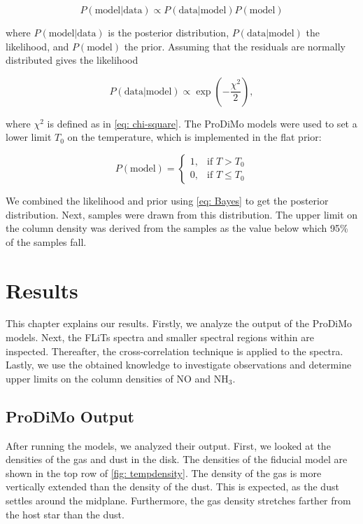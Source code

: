 \documentclass[oneside, single, authoryear, semicolon, 12pt]{lion-msc}
\newcommand{\4}{$_4$}
\newcommand{\3}{$_3$}
\newcommand{\2}{$_2$}
\begin{document}
\begin{equation}
    P(\mathrm{model}|\mathrm{data})\propto P(\mathrm{data}|\mathrm{model})P(\mathrm{model})
    \label{eq: Bayes}
\end{equation}

where $P(\mathrm{model}|\mathrm{data})$ is the posterior distribution, $P(\mathrm{data}|\mathrm{model})$ the likelihood, and $P(\mathrm{model})$ the prior. Assuming that the residuals are normally distributed gives the likelihood

\begin{equation}
    P(\mathrm{data}|\mathrm{model})\propto\exp\left(-\frac{\chi^2}{2}\right),
\end{equation}

where $\chi^2$ is defined as in \autoref{eq: chi-square}. The ProDiMo models were used to set a lower limit $T_0$ on the temperature, which is implemented in the flat prior:

\begin{equation}
    P(\mathrm{model}) = 
    \begin{cases}
        1, & \text{if } T > T_0 \\
        0, & \text{if } T \leq T_0
    \end{cases}
\end{equation}

We combined the likelihood and prior using \autoref{eq: Bayes} to get the posterior distribution. Next, samples were drawn from this distribution. The upper limit on the column density was derived from the samples as the value below which 95\% of the samples fall. 


\chapter{Results}\label{Ch: Results}
This chapter explains our results. Firstly, we analyze the output of the ProDiMo models. Next, the FLiTs spectra and smaller spectral regions within are inspected. Thereafter, the cross-correlation technique is applied to the spectra. Lastly, we use the obtained knowledge to investigate observations and determine upper limits on the column densities of NO and NH\3.

\section{ProDiMo Output}\label{sec: Prodimo output}
After running the models, we analyzed their output. First, we looked at the densities of the gas and dust in the disk. The densities of the fiducial model are shown in the top row of \autoref{fig: tempdensity}. The density of the gas is more vertically extended than the density of the dust. This is expected, as the dust settles around the midplane. Furthermore, the gas density stretches farther from the host star than the dust.
\end{document}
